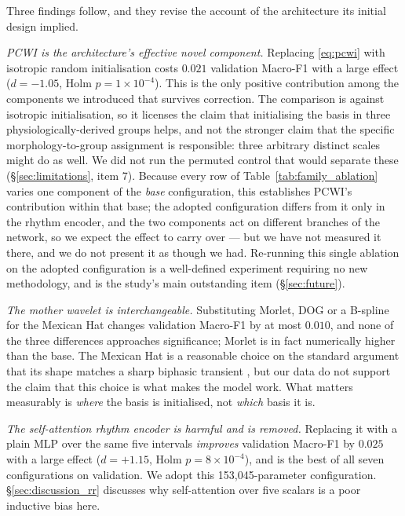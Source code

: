 \documentclass[journal,twoside,web]{ieeecolor}
\begin{document}
Three findings follow, and they revise the account of the architecture its initial design implied.

\emph{PCWI is the architecture's effective novel component.} Replacing \eqref{eq:pcwi} with isotropic random initialisation costs $0.021$ validation Macro-F1 with a large effect ($d=-1.05$, Holm $p=1\times10^{-4}$). This is the only positive contribution among the components we introduced that survives correction. The comparison is against isotropic initialisation, so it licenses the claim that initialising the basis in three physiologically-derived groups helps, and not the stronger claim that the specific morphology-to-group assignment is responsible: three arbitrary distinct scales might do as well. We did not run the permuted control that would separate these (\S\ref{sec:limitations}, item 7). Because every row of Table~\ref{tab:family_ablation} varies one component of the \emph{base} configuration, this establishes PCWI's contribution within that base; the adopted configuration differs from it only in the rhythm encoder, and the two components act on different branches of the network, so we expect the effect to carry over --- but we have not measured it there, and we do not present it as though we had. Re-running this single ablation on the adopted configuration is a well-defined experiment requiring no new methodology, and is the study's main outstanding item (\S\ref{sec:future}).

\emph{The mother wavelet is interchangeable.} Substituting Morlet, DOG or a B-spline for the Mexican Hat changes validation Macro-F1 by at most $0.010$, and none of the three differences approaches significance; Morlet is in fact numerically higher than the base. The Mexican Hat is a reasonable choice on the standard argument that its shape matches a sharp biphasic transient \cite{addison_wavelet_2005}, but our data do not support the claim that this choice is what makes the model work. What matters measurably is \emph{where} the basis is initialised, not \emph{which} basis it is.

\emph{The self-attention rhythm encoder is harmful and is removed.} Replacing it with a plain MLP over the same five intervals \emph{improves} validation Macro-F1 by $0.025$ with a large effect ($d=+1.15$, Holm $p=8\times10^{-4}$), and is the best of all seven configurations on validation. We adopt this 153,045-parameter configuration. \S\ref{sec:discussion_rr} discusses why self-attention over five scalars is a poor inductive bias here.
\end{document}
